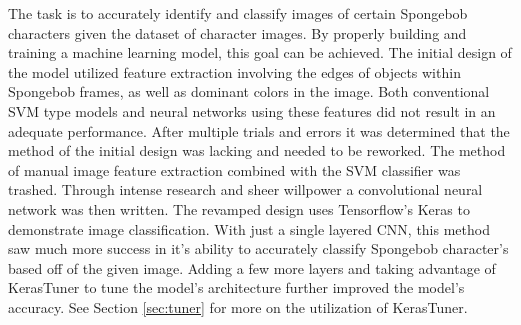 \documentclass{article}
\begin{document}
\begin{multicols}{2}
{\quad
The task is to accurately identify and classify images of certain Spongebob characters given the dataset of character images. By properly building and training a machine learning model, this goal can be achieved.
The initial design of the model utilized feature extraction involving the edges of objects within Spongebob frames, as well as dominant colors in the image. Both conventional SVM type models and neural networks using these features did not result in an adequate performance. After multiple trials and errors it was determined that the method of the initial design was lacking and needed to be reworked. The method of manual image feature extraction combined with the SVM classifier was trashed. \newline
\quad 
Through intense research and sheer willpower a convolutional neural network was then written. The revamped design uses Tensorflow's Keras to demonstrate image classification. With just a single layered CNN, this method saw much more success in it's ability to accurately classify Spongebob character's based off of the given image. Adding a few more layers and taking advantage of KerasTuner to tune the model's architecture further improved the model's accuracy. See Section \ref{sec:tuner} for more on the utilization of KerasTuner.
}


\end{multicols}
\end{document}
